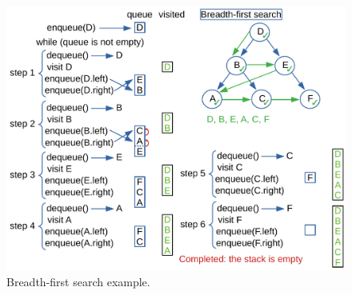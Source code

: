 \begin{figure}[H]
	\begin{center}
		\includegraphics[scale=.6]{chapters/appendix/images/appendixtree/treesappendix_4.pdf}
		\caption[Breadth-first search example.]{Breadth-first search example.}
		\label{appendixtrees_3}
	\end{center}
\end{figure}


